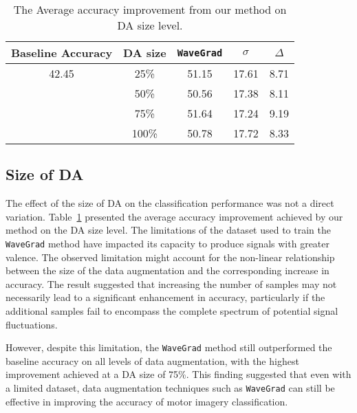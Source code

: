 \begin{table}[ht!]
    \centering
    \caption{The Average accuracy improvement from our method on DA size level.}
    \label{table: The Average accuracy improvement from our method on DA size level}
    \begin{tabular}{ccccc}
        \hline
        Baseline Accuracy & DA size & \texttt{WaveGrad} & \begin{math} \sigma \end{math} & \begin{math} \Delta \end{math} \\
        \hline
        42.45             & 25\%    & 51.15    & 17.61                        & 8.71              \\
                          & 50\%    & 50.56    & 17.38                        & 8.11              \\
                          & 75\%    & 51.64    & 17.24                        & 9.19              \\
                          & 100\%   & 50.78    & 17.72                        & 8.33              \\
        \hline
        \end{tabular}
\end{table}
        
\subsection{Size of DA}
The effect of the size of DA on the classification performance was not a direct variation.
Table~\ref{table: The Average accuracy improvement from our method on DA size level} presented the average accuracy improvement achieved by our method on the DA size level.
The limitations of the dataset used to train the \texttt{WaveGrad} method have impacted its capacity to produce signals with greater valence.
The observed limitation might account for the non-linear relationship between the size of the data augmentation and the corresponding increase in accuracy. 
The result suggested that increasing the number of samples may not necessarily lead to a significant enhancement in accuracy, particularly if the additional samples fail to encompass the complete spectrum of potential signal fluctuations.

However, despite this limitation, the \texttt{WaveGrad} method still outperformed the baseline accuracy on all levels of data augmentation, with the highest improvement achieved at a DA size of 75\%. 
This finding suggested that even with a limited dataset, data augmentation techniques such as \texttt{WaveGrad} can still be effective in improving the accuracy of motor imagery classification.

